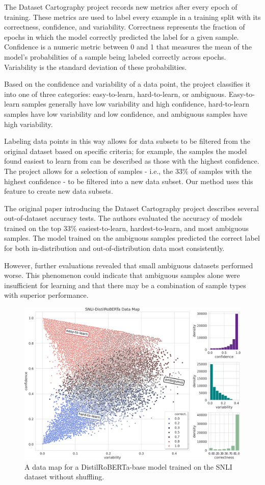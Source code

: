 \documentclass[11pt, a4paper, twocolumn]{article}
\begin{document}
	The Dataset Cartography project records new metrics after every epoch of training. These metrics are used to label every example in a training split with its correctness, confidence, and variability. Correctness represents the fraction of epochs in which the model correctly predicted the label for a given sample. Confidence is a numeric metric between 0 and 1 that measures the mean of the model’s probabilities of a sample being labeled correctly across epochs. Variability is the standard deviation of these probabilities. 
	
	Based on the confidence and variability of a data point, the project classifies it into one of three categories: easy-to-learn, hard-to-learn, or ambiguous. Easy-to-learn samples generally have low variability and high confidence, hard-to-learn samples have low variability and low confidence, and ambiguous samples have high variability. 
	
	Labeling data points in this way allows for data subsets to be filtered from the original dataset based on specific criteria; for example, the samples the model found easiest to learn from can be described as those with the highest confidence. The project allows for a selection of samples - i.e., the 33\% of samples with the highest confidence - to be filtered into a new data subset. Our method uses this feature to create new data subsets.
	
	The original paper introducing the Dataset Cartography project describes several out-of-dataset accuracy tests. The authors evaluated the accuracy of models trained on the top 33\% easiest-to-learn, hardest-to-learn, and most ambiguous samples. The model trained on the ambiguous samples predicted the correct label for both in-distribution and out-of-distribution data most consistently.
	
	However, further evaluations revealed that small ambiguous datasets performed worse. This phenomenon could indicate that ambiguous samples alone were insufficient for learning and that there may be a combination of sample types with superior performance. 
	
	\begin{figure}[!ht]
		\includegraphics[scale=0.75]{data_map.png}\caption{A data map for a DistilRoBERTa-base model trained on the SNLI dataset without shuffling.}
	\end{figure}
	
\end{document}
